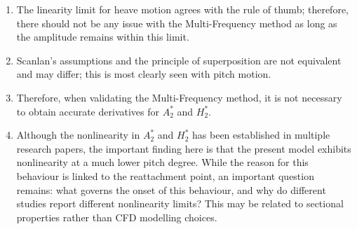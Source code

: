 \documentclass[a4paper, 12pt]{report}
\begin{document}
\begin{enumerate}
    \item The linearity limit for heave motion agrees with the rule of thumb; therefore, there should not be any issue with the Multi-Frequency method as long as the amplitude remains within this limit.
    
    \item Scanlan's assumptions and the principle of superposition are not equivalent and may differ; this is most clearly seen with pitch motion.
    
    \item Therefore, when validating the Multi-Frequency method, it is not necessary to obtain accurate derivatives for $A_2^*$ and $H_2^*$.
    
    \item Although the nonlinearity in $A_2^*$ and $H_2^*$ has been established in multiple research papers, the important finding here is that the present model exhibits nonlinearity at a much lower pitch degree. While the reason for this behaviour is linked to the reattachment point, an important question remains: what governs the onset of this behaviour, and why do different studies report different nonlinearity limits? This may be related to sectional properties rather than CFD modelling choices.
\end{enumerate}
\end{document}

